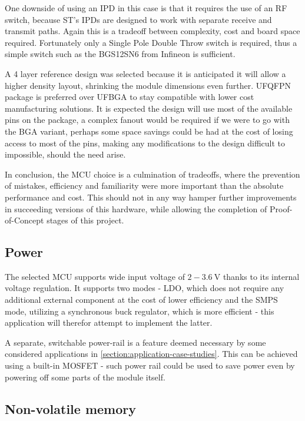 One downside of using an IPD in this case is that it requires the use of an RF switch, because ST's IPDs are designed to work with separate receive and transmit paths. Again this is a tradeoff between complexity, cost and board space required. Fortunately only a Single Pole Double Throw switch is required, thus a simple switch such as the BGS12SN6 from Infineon \cite{infineon_technologies_bgs12sn6_2024} is sufficient.

A 4 layer reference design was selected because it is anticipated it will allow a higher density layout, shrinking the module dimensions even further. UFQFPN package is preferred over UFBGA to stay compatible with lower cost manufacturing solutions. It is expected the design will use most of the available pins on the package, a complex fanout would be required if we were to go with the BGA variant, perhaps some space savings could be had at the cost of losing access to most of the pins, making any modifications to the design difficult to impossible, should the need arise.

In conclusion, the MCU choice is a culmination of tradeoffs, where the prevention of mistakes, efficiency and familiarity were more important than the absolute performance and cost. This should not in any way hamper further improvements in succeeding versions of this hardware, while allowing the completion of Proof-of-Concept stages of this project. 

\subsection{Power}
The selected MCU supports wide input voltage of $2-3.6~\mathrm{V}$ thanks to its internal voltage regulation. It supports two modes - LDO, which does not require any additional external component at the cost of lower efficiency and the SMPS mode, utilizing a synchronous buck regulator, which is more efficient - this application will therefor attempt to implement the latter.

A separate, switchable power-rail is a feature deemed necessary by some considered applications in \ref{section:application-case-studies}. This can be achieved using a built-in MOSFET - such power rail could be used to save power even by powering off some parts of the module itself.

\subsection{Non-volatile memory}

